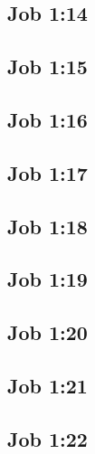 \subsection{Job 1:14}

\subsection{Job 1:15}

\subsection{Job 1:16}

\subsection{Job 1:17}

\subsection{Job 1:18}

\subsection{Job 1:19}

\subsection{Job 1:20}

\subsection{Job 1:21}

\subsection{Job 1:22}



